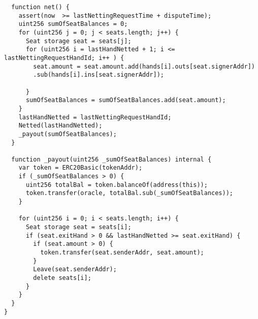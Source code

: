 \documentclass[conference]{IEEEtran}
\begin{document}
\begin{verbatim}
  function net() {
    assert(now  >= lastNettingRequestTime + disputeTime);
    uint256 sumOfSeatBalances = 0;
    for (uint256 j = 0; j < seats.length; j++) {
      Seat storage seat = seats[j];
      for (uint256 i = lastHandNetted + 1; i <= lastNettingRequestHandId; i++ ) {
        seat.amount = seat.amount.add(hands[i].outs[seat.signerAddr])
        .sub(hands[i].ins[seat.signerAddr]);
        
      }
      sumOfSeatBalances = sumOfSeatBalances.add(seat.amount);
    }
    lastHandNetted = lastNettingRequestHandId;
    Netted(lastHandNetted);
    _payout(sumOfSeatBalances);
  }

  function _payout(uint256 _sumOfSeatBalances) internal {
    var token = ERC20Basic(tokenAddr);
    if (_sumOfSeatBalances > 0) {
      uint256 totalBal = token.balanceOf(address(this));
      token.transfer(oracle, totalBal.sub(_sumOfSeatBalances));
    }

    for (uint256 i = 0; i < seats.length; i++) {
      Seat storage seat = seats[i];
      if (seat.exitHand > 0 && lastHandNetted >= seat.exitHand) {
        if (seat.amount > 0) {
          token.transfer(seat.senderAddr, seat.amount);
        }
        Leave(seat.senderAddr);
        delete seats[i];
      }
    }
  }
}
\end{verbatim}





\end{document}
